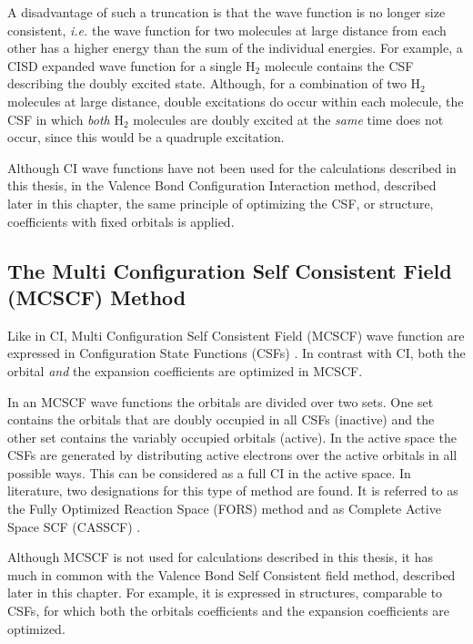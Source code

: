 A disadvantage of such a truncation is that the wave function is no longer size consistent, \textit{i.e.} the wave function for two molecules at large distance from each other has a higher energy than the sum of the individual energies. For example, a CISD expanded wave function for a single H$_2$ molecule contains the CSF describing the doubly excited state. Although, for a combination of two H$_2$ molecules at large distance, double excitations do occur within each molecule, the CSF in which \textit{both} H$_2$ molecules are doubly excited at the \textit{same} time does not occur, since this would be a quadruple excitation.

Although CI wave functions have not been used for the calculations described in this thesis, in the Valence Bond Configuration Interaction method, described later in this chapter, the same principle of optimizing the CSF, or structure, coefficients with fixed orbitals is applied.

\subsection{\label{ch1.sec.mcscf}The Multi Configuration Self Consistent Field (MCSCF) Method}
Like in CI, Multi Configuration Self Consistent Field (MCSCF) wave function are expressed in Configuration State Functions (CSFs) \cite{wahldasbook,daswahl}. In contrast with CI, both the orbital \textit{and} the expansion coefficients are optimized in MCSCF.

In an MCSCF wave functions the orbitals are divided over two sets. One set contains the orbitals that are doubly occupied in all CSFs (inactive) and the other set contains the variably occupied orbitals (active). In the active space the CSFs are generated by distributing active electrons over the active orbitals in all possible ways. This can be considered as a full CI in the active space. In literature, two designations for this type of method are found. It is referred to as the Fully Optimized Reaction Space (FORS) method \cite{fors1,fors2,fors3} and as Complete Active Space SCF (CASSCF) \cite{roos1,roos2}.

Although MCSCF is not used for calculations described in this thesis, it has much in common with the Valence Bond Self Consistent field method, described later in this chapter. For example, it is expressed in structures, comparable to CSFs, for which both the orbitals coefficients and the expansion coefficients are optimized. 


